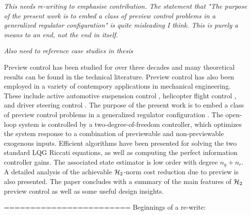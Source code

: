 \label{sec:Conclusions}
\textit{This needs re-writing to emphasise contribution. The statement that "The purpose of the present work
is to embed a class of preview control problems in a generalized regulator
configuration" is quite misleading I think. This is purely a means to an end, not the end in itself. }

\textit{Also need to reference case studies in thesis}


Preview control has been studied for over three decades and many theoretical results can be found in the technical literature. Preview control has also been employed in a variety of contempory applications in mechanical engineering. These include active automotive suspension control \cite{Roh_1999_Stoc_Opt_Prev,Marzbanrad_2004_SuspPrev}, helicopter flight control \cite{Paulino_2006_PreviewRotorcraftAffine}, 
and driver steering control \cite{Cole_2006_PredictiveAndPreviewSteeringControl}. The purpose of the present work is to embed a class of preview control problems in a generalized regulator configuration \cite{LimebeerGreen,ZDG}. The open-loop system is controlled by a two-degree-of-freedom controller, which optimizes the system response to a combination of previewable and non-previewable exogenous inputs. Efficient algorithms have been presented for solving the two standard LQG Riccati equations, as well as computing the perfect information controller gains. The associated state estimator is low order with degree $n_g+n_r$. A detailed analysis of the achievable $\mathcal H_2$-norm cost reduction due to preview is also presented. The paper concludes with a summary of the main features of $\mathcal H_2$ preview control as well as some useful design insights.

========================
Beginnings of a re-write:


